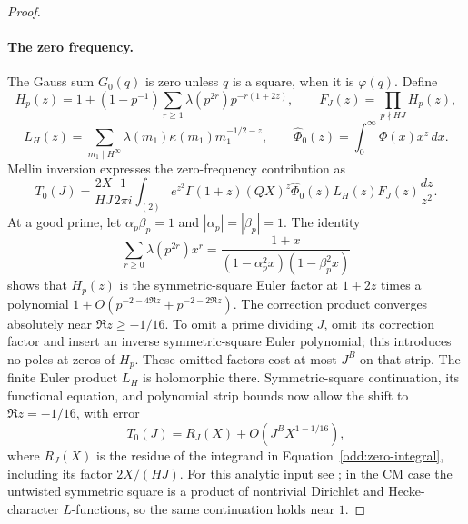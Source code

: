 \begin{proof}
\paragraph{The zero frequency.}
The Gauss sum $G_0(q)$ is zero unless $q$ is a square, when it is
$\varphi(q)$.  Define
\[
 H_p(z)=1+(1-p^{-1})\sum_{r\ge1}
                    \lambda(p^{2r})p^{-r(1+2z)},\qquad
 F_J(z)=\prod_{p\nmid HJ}H_p(z),
\]
\[
 L_H(z)=\sum_{m_1\mid H^\infty}
          \lambda(m_1)\kappa(m_1)m_1^{-1/2-z},\qquad
 \widehat\Phi_0(z)=\int_0^\infty\Phi(x)x^z\,dx.
\]
Mellin inversion expresses the zero-frequency contribution as
\begin{equation}\label{odd:zero-integral}
 T_0(J)=\frac{2X}{HJ}\frac1{2\pi i}\int_{(2)}
 e^{z^2}\Gamma(1+z)(QX)^z\widehat\Phi_0(z)L_H(z)F_J(z)
 \frac{dz}{z^2}.
\end{equation}
At a good prime, let $\alpha_p\beta_p=1$ and
$|\alpha_p|=|\beta_p|=1$.  The identity
\[
 \sum_{r\ge0}\lambda(p^{2r})x^r
 =\frac{1+x}{(1-\alpha_p^2x)(1-\beta_p^2x)}
\]
shows that $H_p(z)$ is the symmetric-square Euler factor at $1+2z$
times a polynomial
$1+O(p^{-2-4\Re z}+p^{-2-2\Re z})$.
The correction product converges absolutely near $\Re z\ge-1/16$.
To omit a prime dividing $J$, omit its correction factor and insert an
inverse symmetric-square Euler polynomial; this introduces no poles at
zeros of $H_p$.  These omitted factors cost at most $J^B$ on that strip.
The finite Euler product $L_H$ is holomorphic there.
Symmetric-square continuation, its functional equation, and polynomial
strip bounds now allow the shift to $\Re z=-1/16$, with error
\begin{equation}\label{odd:zero-error}
 T_0(J)=R_J(X)+O(J^B X^{1-1/16}),
\end{equation}
where $R_J(X)$ is the residue of the integrand in
Equation~\eqref{odd:zero-integral}, including its factor $2X/(HJ)$.
For this analytic input see
\citep[Theorem~9.3 and Remark~9.9]{GelbartJacquet1978}; in the CM case
the untwisted symmetric square is a product of nontrivial Dirichlet and
Hecke-character $L$-functions, so the same continuation holds near $1$.


\end{proof}
